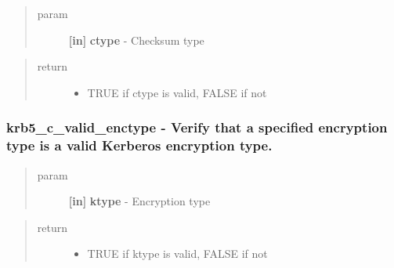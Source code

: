 \documentclass[letterpaper,10pt,english]{sphinxmanual}
\begin{document}
\begin{quote}\begin{description}
\item[{param}] \leavevmode
\textbf{{[}in{]}} \textbf{ctype} - Checksum type

\end{description}\end{quote}
\begin{quote}\begin{description}
\item[{return}] \leavevmode\begin{itemize}
\item {} 
TRUE if ctype is valid, FALSE if not

\end{itemize}

\end{description}\end{quote}


\subsubsection{krb5\_c\_valid\_enctype -  Verify that a specified encryption type is a valid Kerberos encryption type.}
\label{appdev/refs/api/krb5_c_valid_enctype:krb5-c-valid-enctype-verify-that-a-specified-encryption-type-is-a-valid-kerberos-encryption-type}\label{appdev/refs/api/krb5_c_valid_enctype::doc}

\begin{fulllineitems}
\label{appdev/refs/api/krb5_c_valid_enctype:c.krb5_c_valid_enctype}
\end{fulllineitems}

\begin{quote}\begin{description}
\item[{param}] \leavevmode
\textbf{{[}in{]}} \textbf{ktype} - Encryption type

\end{description}\end{quote}
\begin{quote}\begin{description}
\item[{return}] \leavevmode\begin{itemize}
\item {} 
TRUE if ktype is valid, FALSE if not

\end{itemize}

\end{description}\end{quote}
\end{document}
